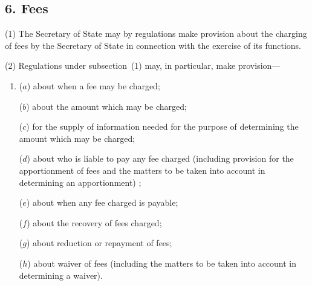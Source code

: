 \documentclass[12pt,a4paper]{article}
\begin{document}
%
%
%
%
%

\subsection{6. Fees}

(1) The Secretary of State may by regulations make provision about the charging of fees by the Secretary of State in connection with the exercise of its functions.

(2) Regulations under subsection~(1) may, in particular, make provision—
\begin{enumerate}\item[]
($a$) about when a fee may be charged;

($b$) about the amount which may be charged;

($c$) for the supply of information needed for the purpose of determining the amount which may be charged;

($d$) about who is liable to pay any fee charged
(including provision for the apportionment of fees and the matters to be taken into account in determining an apportionment)%
;

($e$) about when any fee charged is payable;

($f$) about the recovery of fees charged;

($g$) about 
reduction or repayment of fees;

($h$) about waiver of fees (including the matters to be taken into account in determining a waiver).
\end{enumerate}
\end{document}
